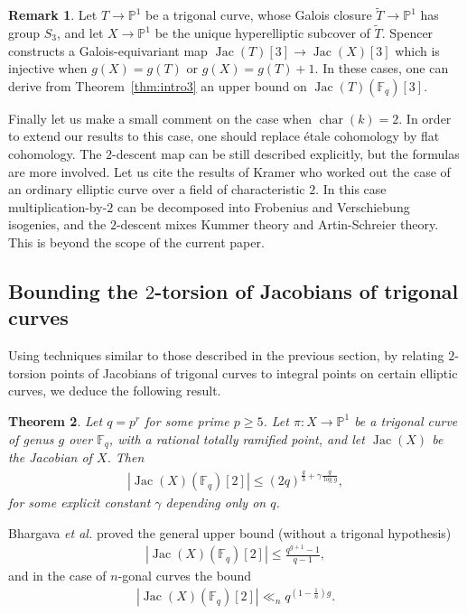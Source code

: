 \documentclass[11pt]{article}
\theoremstyle{plain}
\newtheorem{theorem}{Theorem}[section]
\theoremstyle{definition}
\newtheorem{remark}[theorem]{Remark}
\DeclareMathOperator{\Jac}{Jac}
\DeclareMathOperator{\car}{char}
\newcommand{\PP}{\mathbb{P}}
\begin{document}
\begin{remark}
Let $T\to \PP^1$ be a trigonal curve, whose Galois closure $\tilde{T}\to \PP^1$ has group $S_3$, and let $X\to \PP^1$ be the unique hyperelliptic subcover of $\tilde{T}$. Spencer \cite{spencer2025} constructs a Galois-equivariant map $\Jac(T)[3] \to \Jac(X)[3]$ which is injective when $g(X) = g(T)$ or $g(X) = g(T) + 1$. In these cases, one can derive from Theorem~\ref{thm:intro3} an upper bound on $\Jac(T)(\mathbb{F}_q)[3]$.
\end{remark}

Finally let us make a small comment on the case when $\car(k)=2$. In order to extend our results to this case, one should replace {\'e}tale cohomology by flat cohomology. The $2$-descent map can be still described explicitly, but the formulas are more involved. Let us cite the results of Kramer \cite{kramer77} who worked out the case of an ordinary elliptic curve over a field of characteristic $2$. In this case multiplication-by-$2$ can be decomposed into Frobenius and Verschiebung isogenies, and the $2$-descent mixes Kummer theory and Artin-Schreier theory. This is beyond the scope of the current paper.


\subsection*{Bounding the $2$-torsion of Jacobians of trigonal curves}

Using techniques similar to those described in the previous section, by relating $2$-torsion points of Jacobians of trigonal curves to integral points on certain elliptic curves, we deduce the following result.


\begin{theorem}
\label{thm:intro4}
Let $q=p^r$ for some prime $p\geq 5$. Let $\pi:X\to\mathbb{P}^1$ be a trigonal curve of genus $g$ over $\mathbb{F}_q$, with a rational totally ramified point, and let $\Jac(X)$ be the Jacobian of $X$. Then
\begin{align*}
|\Jac(X)(\mathbb{F}_q)[2]|\leq (2q)^{\frac{g}{3}+\gamma\frac{g}{\log g}},
\end{align*}
for some explicit constant $\gamma$ depending only on $q$.
\end{theorem}

Bhargava \emph{et al.} \cite[Theorem~7.1]{bhargava17} proved the general upper bound (without a trigonal hypothesis)
\begin{align*}
|\Jac(X)(\mathbb{F}_q)[2]|\leq \frac{q^{g+1}-1}{q-1},
\end{align*}
and in the case of $n$-gonal curves the bound
\begin{align*}
|\Jac(X)(\mathbb{F}_q)[2]|\ll_n q^{(1-\frac{1}{n})g}.
\end{align*}
\end{document}
